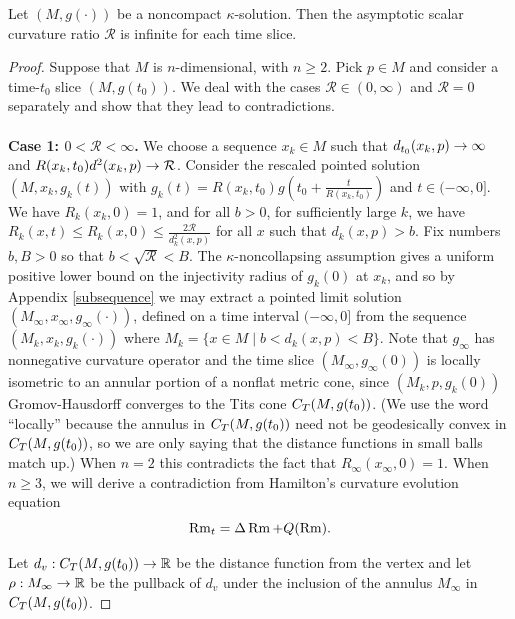 \begin{theorem}
  \label{thm:kl-asymptotic-scalar-curvature-asymptotic-volume-ratio-compactness-kappa-solutions}
 \label{asympscalar}
Let $(M,g(\cdot))$ be a noncompact $\kappa$-solution.
Then the asymptotic scalar curvature ratio ${\mathcal R}$
is infinite for each time slice.
\end{theorem}
\begin{proof}
Suppose that $M$ is $n$-dimensional,
with $n\geq 2$.   Pick $p\in M$ and consider a time-$t_0$
slice $(M,g(t_0))$.
We deal with the cases ${\mathcal R} \in (0, \infty)$ and
${\mathcal R} = 0$ separately and show that they lead to contradictions. \\ \\
{\bf Case 1: $0<{\mathcal R}<\infty$.}  We choose a sequence
$x_k\in M$ such that $d_{t_0}(x_k,p)\rightarrow \infty$ and
$R(x_k,t_0)d^2(x_k,p)\rightarrow{\mathcal R}$.
Consider the rescaled pointed solution
$(M,x_k,g_k(t))$ with
$g_k(t) =R(x_k,t_0)g(t_0 + \frac{t}{R(x_k,t_0)})$ and $t\in (-\infty,0]$.
We have $R_k(x_k,0)=1$, and for all $b>0$, for sufficiently large $k$,
we have $R_k(x,t)\leq R_k(x,0)\leq \frac{2{\mathcal R}}{d_k^2(x,p)}$
for all $x$ such that $d_k(x,p)>b$.
Fix numbers $b, B > 0$ so that  $b<\sqrt{{\mathcal R}}<B$.
The $\kappa$-noncollapsing assumption gives a uniform positive
lower bound on the
injectivity radius of $g_k(0)$ at $x_k$,
and so by Appendix \ref{subsequence}
we may extract a pointed limit solution
$(M_\infty,x_\infty,g_\infty(\cdot))$, defined on a time interval
$(-\infty,0]$ from the sequence
$(M_k,x_k,g_k(\cdot))$ where $M_k =\{x\in M\mid b<d_k(x,p)<B\}$.
Note that $g_\infty$ has nonnegative curvature operator and
the time slice $(M_\infty,g_\infty(0))$ is locally
isometric to an annular
portion of a nonflat metric cone, since $(M_k,p,g_k(0))$
Gromov-Hausdorff converges to the Tits cone $C_T(M,g(t_0))$.
(We use the word ``locally'' because the annulus in $C_T(M,g(t_0))$
need not be geodesically convex in $C_T(M,g(t_0))$, so we are only
saying that the distance functions in small balls match up.)
When $n=2$ this contradicts the fact that $R_\infty(x_\infty,0)=1$.
When $n\geq 3$, we will derive a contradiction from
Hamilton's curvature evolution equation
\begin{equation}
\label{curvevol}
\operatorname{Rm}_t=\Delta \operatorname{Rm}+Q(\operatorname{Rm}).
\end{equation}

Let $d_v : C_T(M,g(t_0)) \rightarrow {\mathbb R}$ be the distance function
from the vertex and let
$\rho:M_\infty\rightarrow {\mathbb R}$ be the pullback of $d_v$ under the inclusion of
the annulus $M_\infty$ in $C_T(M,g(t_0))$.


\end{proof}
